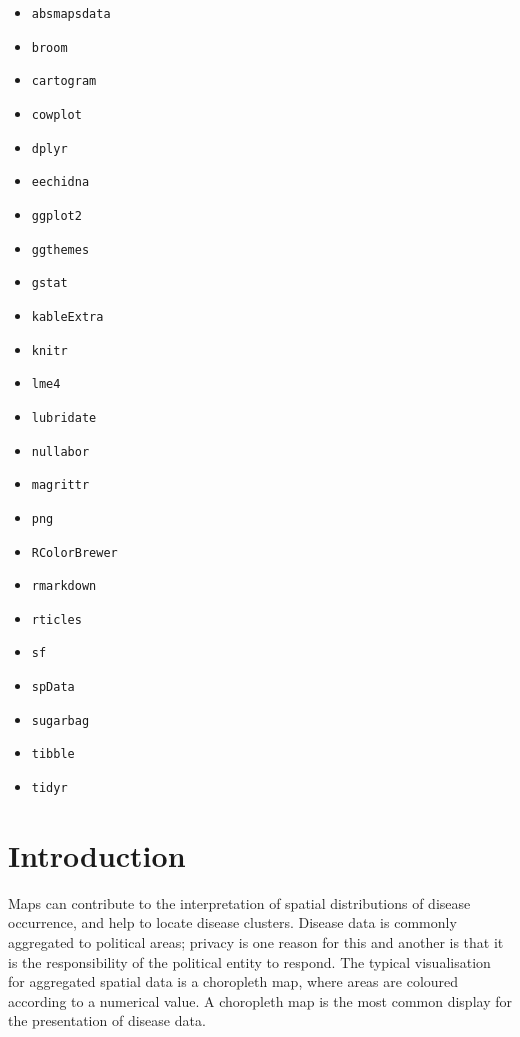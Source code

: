 \documentclass{monashthesis}
\begin{document}
\begin{itemize}
\tightlist
\item
  \texttt{absmapsdata} \autocite{ABSmaps}
\item
  \texttt{broom} \autocite{broom}
\item
  \texttt{cartogram} \autocite{cartogram}
\item
  \texttt{cowplot} \autocite{cowplot}
\item
  \texttt{dplyr} \autocite{dplyr}
\item
  \texttt{eechidna} \autocite{eechidna}
\item
  \texttt{ggplot2} \autocite{ggplot2}
\item
  \texttt{ggthemes} \autocite{ggthemes}
\item
  \texttt{gstat} \autocite{gstat}
\item
  \texttt{kableExtra} \autocite{kableExtra}
\item
  \texttt{knitr} \autocite{knitr}
\item
  \texttt{lme4} \autocite{lme4}
\item
  \texttt{lubridate} \autocite{lubridate}
\item
  \texttt{nullabor} \autocite{nullabor}
\item
  \texttt{magrittr} \autocite{magrittr}
\item
  \texttt{png} \autocite{png}
\item
  \texttt{RColorBrewer} \autocite{RColorBrewer}
\item
  \texttt{rmarkdown} \autocite{rmarkdown}
\item
  \texttt{rticles} \autocite{rticles}
\item
  \texttt{sf} \autocite{sf}
\item
  \texttt{spData} \autocite{spData}
\item
  \texttt{sugarbag} \autocite{sugarbag}
\item
  \texttt{tibble} \autocite{tibble}
\item
  \texttt{tidyr} \autocite{tibble}
\end{itemize}

\hypertarget{intro1}{%
\chapter{Introduction}\label{intro1}}

Maps can contribute to the interpretation of spatial distributions of disease occurrence, and help to locate disease clusters. Disease data is commonly aggregated to political areas; privacy is one reason for this and another is that it is the responsibility of the political entity to respond. The typical visualisation for aggregated spatial data is a choropleth map, where areas are coloured according to a numerical value. A choropleth map is the most common display for the presentation of disease data.
\end{document}
